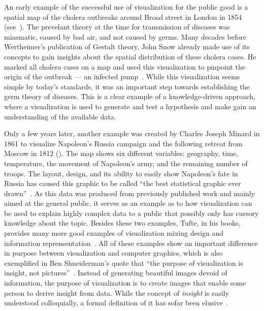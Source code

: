 An early example of the successful use of visualization for the public good is a spatial map of the cholera outbreaks around Broad street in London in 1854 (see~).  The prevelant theory at the time for transmission of diseases was miasmatic, caused by bad air, and not caused by germs.  Many decades before Wertheimer's publication of Gestalt theory, John Snow already made use of its concepts to gain insights about the spatial distribution of these cholera cases.  He marked all cholera cases on a map and used this visualization to pinpoint the origin of the outbreak --- an infected pump~\cite{snow1855mode}.  While this visualization seems simple by today's standards, it was an important step towards establishing the germ theory of diseases.  This is a clear example of a knowledge-driven approach, where a visualization is used to generate and test a hypothesis and make gain an understanding of the available data.

Only a few years later, another example was created by Charles Joseph Minard in 1861 to visualize Napoleon's Russia campaign and the following retreat from Moscow in 1812 ().  The map shows six different variables: geography, time, temperature, the movement of Napoleon's army, and the remaining number of troops.  The layout, design, and its ability to easily show Napoleon's fate in Russia has caused this graphic to be called ``the best statistical graphic ever drawn''~\cite{tufte1983visual}.  As this data was produced from previously published work and mainly aimed at the general public, it serves as an example as to how visualization can be used to explain highly complex data to a public that possibly only has cursory knowledge about the topic.  Besides these two examples, Tufte, in his books, provides many more good examples of visualization mixing design and information reprensentation~\cite{tufte1991envisioning}.  All of these examples show an important difference in purpose between visualization and computer graphics, which is also exemplified in Ben Shneiderman's quote that ``the purpose of visualization is insight, not pictures''~\cite{card1999readings}.  Instead of generating beautiful images devoid of information, the purpose of visualization is to create images that enable some person to derive insight from data.  While the concept of \emph{insight} is easily understood colloquially, a formal definition of it has sofar been elusive~\cite{north2006toward}.

